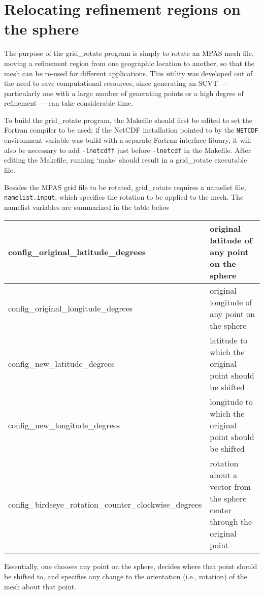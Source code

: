 \section{Relocating refinement regions on the sphere}
\label{sec:grid_rotate} 

The purpose of the grid\_rotate program is simply to rotate an MPAS mesh file,
moving a refinement region from one geographic location to another, so that the
mesh can be re-used for different applications. This utility was developed out
of the need to save computational resources, since generating an SCVT ---
particularly one with a large number of generating points or a high degree of
refinement --- can take considerable time.

To build the grid\_rotate program, the Makefile should first be edited to set
the Fortran compiler to be used; if the NetCDF installation pointed to by the
{\tt NETCDF} environment variable was build with a separate Fortran interface
library, it will also be necessary to add {\tt -lnetcdff} just before {\tt -lnetcdf} in 
the Makefile. After editing the Makefile, running `make' should
result in a grid\_rotate executable file.

Besides the MPAS grid file to be rotated, grid\_rotate requires a namelist file,
{\tt namelist.input}, which specifies the rotation to be applied to the mesh.
The namelist variables are summarized in the table below
   
\vspace{12pt}
\begin{longtable}{|p{3.25in} |p{2.5in}|}
\hline
config\_original\_latitude\_degrees & original latitude of any point on the sphere \\ \hline
config\_original\_longitude\_degrees & original longitude of any point on the sphere \\ \hline
config\_new\_latitude\_degrees &  latitude to which the original point should be shifted \\ \hline
config\_new\_longitude\_degrees &  longitude to which the original point should be shifted \\ \hline
config\_birdseye\_rotation\_counter\_clockwise\_degrees & rotation about a vector from the sphere center through the original point \\ \hline
\end{longtable}
\vspace{12pt}

\noindent Essentially, one chooses any point on the sphere, decides where that
point should be shifted to, and specifies any change to the orientation (i.e.,
rotation) of the mesh about that point. 

